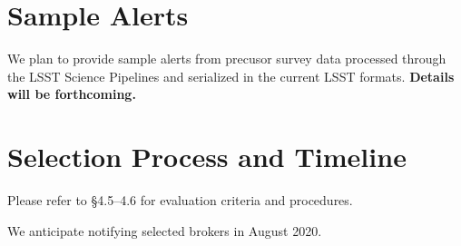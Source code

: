 \documentclass[DM,toc,lsstdraft]{lsstdoc}
\begin{document}
\section{Sample Alerts}

We plan to provide sample alerts from precusor survey data processed through the LSST Science Pipelines and serialized in the current LSST formats.
\textbf{Details will be forthcoming.}

\section{Selection Process and Timeline}

Please refer to  \S4.5--4.6 for evaluation criteria and procedures.

We anticipate notifying selected brokers in August 2020.

%


\end{document}
